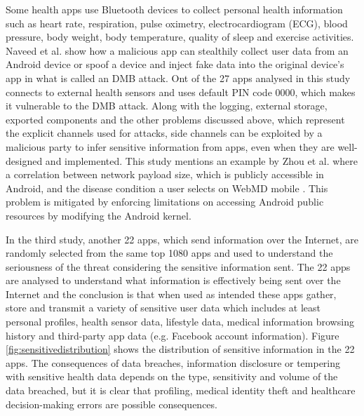 Some health apps use Bluetooth devices to collect personal health information such as heart rate, respiration, pulse oximetry, electrocardiogram (ECG), blood pressure, body weight, body temperature, quality of sleep and exercise activities. Naveed et al. \cite{naveed2014inside} show how a malicious app can stealthily collect user data from an Android device or spoof a device and inject fake data into the original device's app in what is called an \ac{DMB} attack. Ont of the 27 apps analysed in this study connects to external health sensors and uses default PIN code 0000, which makes it vulnerable to the \ac{DMB} attack. Along with the logging, external storage, exported components and the other problems discussed above, which represent the explicit channels used for attacks, side channels can be exploited by a malicious party to infer sensitive information from apps, even when they are well-designed and implemented. This study mentions an example by Zhou et al. \cite{zhou2013identity} where a correlation between network payload size, which is publicly accessible in Android, and the disease condition a user selects on WebMD mobile \cite{webmd}. This problem is mitigated by enforcing limitations on accessing Android public resources by modifying the Android kernel. 

In the third study, another 22 apps, which send information over the Internet, are randomly selected from the same top 1080 apps and used to understand the seriousness of the threat considering the sensitive information sent. The 22 apps are analysed to understand what information is effectively being sent over the Internet and the conclusion is that when used as intended these apps gather, store and transmit a variety of sensitive user data which includes at least personal profiles, health sensor data, lifestyle data, medical information browsing history and third-party app data (e.g. Facebook account information). Figure \ref{fig:sensitivedistribution} shows the distribution of sensitive information in the 22 apps. The consequences of data breaches, information disclosure or tempering with sensitive health data depends on the type, sensitivity and volume of the data breached, but it is clear that profiling, medical identity theft and healthcare decision-making errors are possible consequences.

